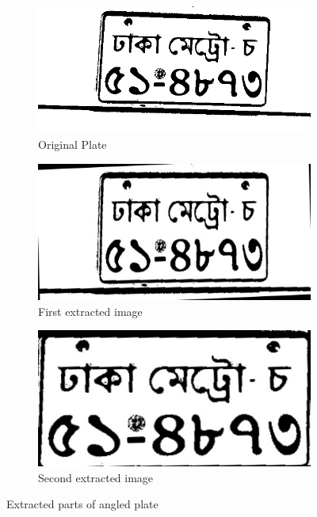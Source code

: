 \begin{figure}
\begin{subfigure}{\textwidth}
    \centering
    \includegraphics[width=0.5\linewidth]{./img/experiment/stage.10/00-angle}
    \caption{Original Plate}
\end{subfigure}
\begin{subfigure}{0.5\textwidth}
    \centering
    \includegraphics[width=0.9\linewidth]{./img/experiment/stage.13/00-00-angle}
    \caption{First extracted image}
\end{subfigure}
\begin{subfigure}{0.5\textwidth}
    \centering
    \includegraphics[width=0.9\linewidth]{./img/experiment/stage.13/01-00-angle}
    \caption{Second extracted image}
\end{subfigure}
\caption{Extracted parts of angled plate}
\label{fig:ExtractedResult3}
\end{figure}


